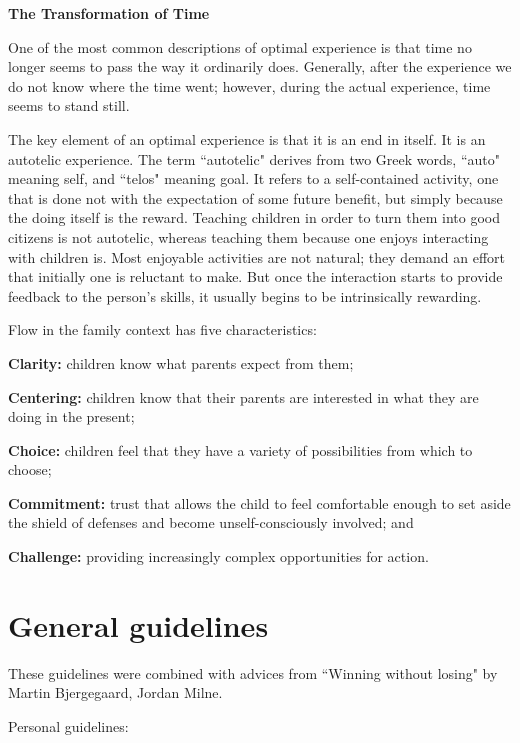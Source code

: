 \textbf{The Transformation of Time}

One of the most common descriptions of optimal experience is that time no longer seems to pass the way it ordinarily does. Generally, after the experience we do not know where the time went; however, during the actual experience, time seems to stand still.

The key element of an optimal experience is that it is an end in itself. It is an autotelic experience. The term ``autotelic" derives from two Greek words, ``auto" meaning self, and ``telos" meaning goal. It refers to a self-contained activity, one that is done not with the expectation of some future benefit, but simply because the doing itself is the reward. Teaching children in order to turn them into good citizens is not autotelic, whereas teaching them because one enjoys interacting with children is. Most enjoyable activities are not natural; they demand an effort that initially one is reluctant to make. But once the interaction starts to provide feedback to the person's skills, it usually begins to be intrinsically rewarding.

Flow in the family context has five characteristics:
\begin{compactitem}
\item \textbf{Clarity:} children know what parents expect from them; 
\item \textbf{Centering:} children know that their parents are interested in what they are doing in the present;
\item \textbf{Choice:} children feel that they have a variety of possibilities from which to choose;
\item \textbf{Commitment:} trust that allows the child to feel comfortable enough to set aside the shield of defenses and become unself-consciously involved; and
\item \textbf{Challenge:} providing increasingly complex opportunities for action.
\end{compactitem}

\section{General guidelines}

These guidelines were combined with advices from ``Winning without losing" by Martin Bjergegaard, Jordan Milne.

Personal guidelines:

